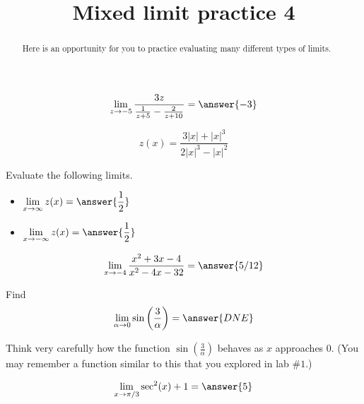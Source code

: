 \documentclass[handout]{ximera}
\title{Mixed limit practice 4}
\begin{document}
\begin{abstract}
Here is an opportunity for you to practice evaluating many different types of limits. 
\end{abstract}
\maketitle

\begin{exercise}
\[\lim_{z \to -5} \frac{3z}{\frac{1}{z+5}-\frac{2}{z+10}} = \answer{-3}\]
\end{exercise}

\begin{exercise}
\[
z(x) = \frac{3|x|+|x|^3}{2|x|^3 - |x|^2}
\]

Evaluate the following limits.  

\begin{itemize}

\item $\displaystyle\lim_{x \to \infty} z(x) = \answer{\frac{1}{2}}$

\item $\displaystyle\lim_{x \to -\infty} z(x) = \answer{\frac{1}{2}}$

\end{itemize}

\end{exercise}

\begin{exercise}
\[\lim_{x \to -4} \frac{x^2+3x-4}{x^2-4x-32} = \answer{5/12}\]
\end{exercise}

\begin{exercise}
Find
\[
\lim_{\alpha \to 0} \sin\left(\frac{3}{\alpha}\right)
= \answer{DNE}
\]

\begin{hint}
Think very carefully how the function $\sin\left(\frac{3}{\alpha}\right)$ behaves as $x$ approaches 0.  (You may remember a function similar to this that you explored in lab $\# 1$.) 
\end{hint}

\end{exercise}


\begin{exercise}
\[\lim_{x \to \pi/3} \sec^2(x)+1 = \answer{5}\]
\end{exercise}
\end{document}
